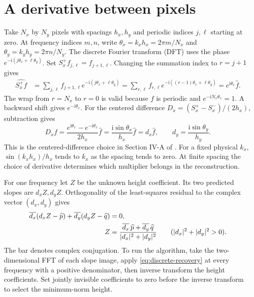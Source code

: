 \documentclass[11pt,a4paper]{article}
\numberwithin{equation}{section}
\newcommand{\ii}{\mathrm{i}}
\begin{document}
\newpage
\section{A derivative between pixels}

Take $N_x$ by $N_y$ pixels with spacings $h_x,h_y$ and periodic indices
$j,\ell$ starting at zero. At frequency indices $m,n$, write
$\theta_x=k_xh_x=2\pi m/N_x$ and $\theta_y=k_yh_y=2\pi n/N_y$. The
discrete Fourier transform (DFT) uses the phase
$e^{-\ii(j\theta_x+\ell\theta_y)}$. Set $S_x^+ f_{j,\ell}=f_{j+1,\ell}$.
Changing the summation index to $r=j+1$ gives
\begin{align}
 \widehat{S_x^+ f}
 &=\sum_{j,\ell} f_{j+1,\ell}e^{-\ii(j\theta_x+\ell\theta_y)}
   =\sum_{r,\ell} f_{r,\ell}e^{-\ii((r-1)\theta_x+\ell\theta_y)}
   =e^{\ii\theta_x}\widehat f . \label{eq:dft-shift}
\end{align}
The wrap from $r=N_x$ to $r=0$ is valid because $f$ is periodic and
$e^{-\ii N_x\theta_x}=1$. A backward shift gives $e^{-\ii\theta_x}$.
For the centered difference $D_x=(S_x^+-S_x^-)/(2h_x)$, subtraction gives
\begin{equation}
 \widehat{D_x f}
 =\frac{e^{\ii\theta_x}-e^{-\ii\theta_x}}{2h_x}\widehat f
 =\frac{\ii\sin\theta_x}{h_x}\widehat f
 =d_x\widehat f,\qquad d_y=\frac{\ii\sin\theta_y}{h_y} .
 \label{eq:centered-symbol}
\end{equation}
This is the centered-difference choice in Section IV-A of \cite{FC}.
For a fixed physical $k_x$, $\sin(k_xh_x)/h_x$ tends to $k_x$
as the spacing tends to zero. At finite spacing the choice of derivative
determines which multiplier belongs in the reconstruction.

For one frequency let $Z$ be the unknown height coefficient. Its two
predicted slopes are $d_xZ,d_yZ$. Orthogonality of the least-squares
residual to the complex vector $(d_x,d_y)$ gives
\begin{align}
 \overline{d_x}(d_xZ-\widehat p)+\overline{d_y}(d_yZ-\widehat q)&=0,
 \notag\\
 Z&=\frac{\overline{d_x}\,\widehat p+\overline{d_y}\,\widehat q}
               {|d_x|^2+|d_y|^2}
 \qquad (|d_x|^2+|d_y|^2>0). \label{eq:discrete-recovery}
\end{align}
The bar denotes complex conjugation. To run the algorithm, take the
two-dimensional FFT of each slope image, apply \eqref{eq:discrete-recovery}
at every frequency with a positive denominator, then inverse transform the
height coefficients. Set jointly invisible coefficients to zero before the
inverse transform to select the minimum-norm height.
\end{document}
